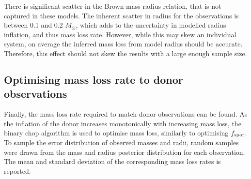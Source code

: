 There is significant scatter in the Brown mass-radius relation, that is not captured in these models. The inherent scatter in radius for the observations is  between 0.1 and 0.2 $M_\odot$, which adds to the uncertainty in modelled radius inflation, and thus mass loss rate.
However, while this may skew an individual system, on average the inferred mass loss from model radius should be accurate. Therefore, this effect should not skew the results with a large enough sample size.


\subsection{Optimising mass loss rate to donor observations}
\label{sect:modelling:optimising mass loss rate to observations}

Finally, the mass loss rate required to match donor observations can be found. As the inflation of the donor increases monotonically with increasing mass loss, the binary chop algorithm is used to optimise mass loss, similarly to optimising $f_{\rm spot}$.
To sample the error distribution of observed masses and radii, random samples were drawn from the mass and radius posterior distribution for each observation. The mean and standard deviation of the corresponding mass loss rates is reported.

